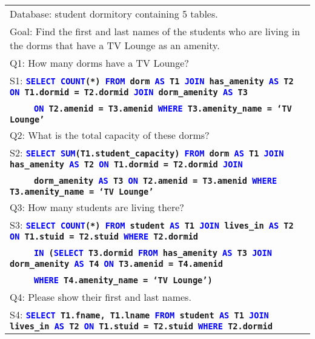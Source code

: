 \documentclass[11pt,a4paper]{article}
\newcommand{\keyword}[1]{\textcolor{blue}{#1}}
\newcommand{\sql}[1]{\textbf{\texttt{#1}}}
\begin{document}
\begin{table*}[t!]
\begin{tabular}{|p{\textwidth}|}
\hline
\small{Database: student dormitory containing 5 tables.}\\
\small{Goal: Find the first and last names of the students who are living in the dorms that have a TV Lounge as an amenity.}\\
\hdashline
\small{Q1: How many dorms have a TV Lounge?}\\
\small{S1:} \scriptsize{\sql{\keyword{SELECT} \keyword{COUNT}(*) \keyword{FROM} dorm \keyword{AS} T1 \keyword{JOIN} has\_amenity \keyword{AS} T2 \keyword{ON} T1.dormid = T2.dormid \keyword{JOIN} dorm\_amenity \keyword{AS} T3}}\\
\vspace{-.18in}
~~~~~\scriptsize{\sql{\keyword{ON} T2.amenid = T3.amenid \keyword{WHERE} T3.amenity\_name = `TV Lounge'}}
\\
\small{Q2: What is the total capacity of these dorms?}\\
\small{S2:} \scriptsize{\sql{\keyword{SELECT} \keyword{SUM}(T1.student\_capacity) \keyword{FROM} dorm \keyword{AS} T1 \keyword{JOIN} has\_amenity \keyword{AS} T2 \keyword{ON} T1.dormid = T2.dormid \keyword{JOIN}}} \\
\vspace{-.18in}
~~~~~\scriptsize{\sql{dorm\_amenity \keyword{AS} T3 \keyword{ON} T2.amenid = T3.amenid \keyword{WHERE} T3.amenity\_name = `TV Lounge'}}
\\
\small{Q3: How many students are living there?}\\
\small{S3:} \scriptsize{\sql{\keyword{SELECT} \keyword{COUNT}(*) \keyword{FROM} student \keyword{AS} T1 \keyword{JOIN} lives\_in \keyword{AS} T2 \keyword{ON} T1.stuid = T2.stuid \keyword{WHERE} T2.dormid}}\\
\vspace{-.18in}
~~~~~\scriptsize{\sql{\keyword{IN} (\keyword{SELECT} T3.dormid \keyword{FROM} has\_amenity \keyword{AS} T3 \keyword{JOIN} dorm\_amenity \keyword{AS} T4 \keyword{ON} T3.amenid = T4.amenid}}\\
\vspace{-.23in}
~~~~~\scriptsize{\sql{\keyword{WHERE} T4.amenity\_name = `TV Lounge')}}
\\
\small{Q4: Please show their first and last names.}\\
\small{S4:} \scriptsize{\sql{\keyword{SELECT} T1.fname, T1.lname \keyword{FROM} student \keyword{AS} T1 \keyword{JOIN} lives\_in \keyword{AS} T2 \keyword{ON} T1.stuid = T2.stuid \keyword{WHERE} T2.dormid}}\\

\end{tabular}
\end{table*}
\end{document}

